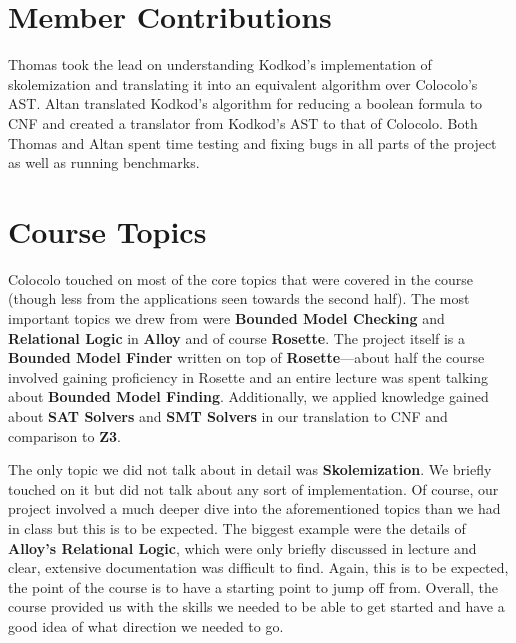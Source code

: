 \documentclass[10pt]{article}
\theoremstyle{definition}
\begin{document}
  \section{Member Contributions}

  Thomas took the lead on understanding Kodkod's implementation of skolemization and translating it into an equivalent algorithm over Colocolo's AST. Altan translated Kodkod's algorithm for reducing a boolean formula to CNF and created a translator from Kodkod's AST to that of Colocolo. Both Thomas and Altan spent time testing and fixing bugs in all parts of the project as well as running benchmarks.

  \section{Course Topics}

  Colocolo touched on most of the core topics that were covered in the course (though less from the applications seen towards the second half). The most important topics we drew from were \textbf{Bounded Model Checking} and \textbf{Relational Logic} in \textbf{Alloy} and of course \textbf{Rosette}. The project itself is a \textbf{Bounded Model Finder} written on top of \textbf{Rosette}---about half the course involved gaining proficiency in Rosette and an entire lecture was spent talking about \textbf{Bounded Model Finding}. Additionally, we applied knowledge gained about \textbf{SAT Solvers} and \textbf{SMT Solvers} in our translation to CNF and comparison to \textbf{Z3}.

  The only topic we did not talk about in detail was \textbf{Skolemization}. We briefly touched on it but did not talk about any sort of implementation. Of course, our project involved a much deeper dive into the aforementioned topics than we had in class but this is to be expected. The biggest example were the details of \textbf{Alloy's Relational Logic}, which were only briefly discussed in lecture and clear, extensive documentation was difficult to find. Again, this is to be expected, the point of the course is to have a starting point to jump off from. Overall, the course provided us with the skills we needed to be able to get started and have a good idea of what direction we needed to go.
\end{document}
